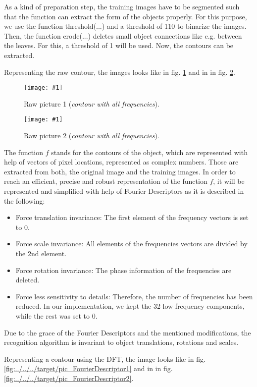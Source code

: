 \documentclass[a4paper,headings=small]{scrartcl}
\numberwithin{equation}{section} %
\numberwithin{figure}{section}   %
\newcommand{\image}[3]{
	\begin{figure}[htbp]
		\centering
		\texttt{[image: \#1]}
		\caption{#3}
		\label{fig:#1}
	\end{figure}
}
\newcommand{\iBinThreshold}{110}
\newcommand{\iNumOfErosions}{1}
\newcommand{\iFDNormDimensions}{32}
\begin{document}
As a kind of preparation step, the training images have to be segmented such that the 
function can extract the form of the objects properly.
For this purpose, we use the function threshold(...) and a threshold of \iBinThreshold{} to binarize the images.
Then, the function erode(...) deletes small object connections like e.g. between the leaves.
For this, a threshold of \iNumOfErosions{} will be used.
Now, the contours can be extracted.

Representing the raw contour, the images looks like in fig. \ref{fig:../../../target/pic_RawFourierDescriptor1} 
and in in fig. \ref{fig:../../../target/pic_RawFourierDescriptor2}.

\image{../../../target/pic_RawFourierDescriptor1}{0.2}{%
		Raw picture 1 (\emph{contour with all frequencies}).}
\image{../../../target/pic_RawFourierDescriptor2}{0.5}{%
		Raw picture 2 (\emph{contour with all frequencies}).}

The function $f$ stands for the contours of the object,
which are represented with help of vectors of pixel locations, represented as complex numbers.
Those are extracted from both, the original image and the training images.
In order to reach an efficient, precise and robust representation of the function $f$, 
it will be represented and simplified with help of Fourier Descriptors as it is described in the following:

\begin{itemize}
\item Force translation invariance: The first element of the frequency vectors is set to 0.
\item Force scale invariance:  All elements of the frequencies vectors are divided by the 2nd element.
\item Force rotation invariance: The phase information of the frequencies are deleted.
\item Force less sensitivity to details: Therefore, the number of frequencies has been reduced.
In our implementation, we kept the \iFDNormDimensions{} low frequency components, while the rest was set to 0.
\end{itemize}

Due to the grace of the Fourier Descriptors and the mentioned modifications, 
the recognition algorithm is invariant to object translations,
rotations and scales.

Representing a contour using the DFT, the image looks like in fig. \ref{fig:../../../target/pic_FourierDescriptor1} 
and in in fig. \ref{fig:../../../target/pic_FourierDescriptor2}.
\end{document}
